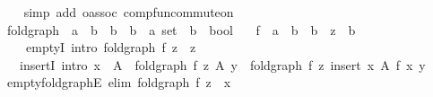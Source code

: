 \begin{isabellebody}
%
\isadelimproof
\ \ %
\endisadelimproof
%
\isatagproof
{}\isamarkupfalse%
\ {\isacharparenleft}{\kern0pt}simp\ add{\isacharcolon}{\kern0pt}\ o{\isacharunderscore}{\kern0pt}assoc\ comp{\isacharunderscore}{\kern0pt}fun{\isacharunderscore}{\kern0pt}commute{\isacharunderscore}{\kern0pt}on{\isacharparenright}{\kern0pt}%
\endisatagproof
{\isafoldproof}%
%
\isadelimproof
\isanewline
%
\endisadelimproof
\isanewline
{}\isamarkupfalse%
\isanewline
\isanewline
{}\isamarkupfalse%
\ fold{\isacharunderscore}{\kern0pt}graph\ {\isacharcolon}{\kern0pt}{\isacharcolon}{\kern0pt}\ {\isachardoublequoteopen}{\isacharparenleft}{\kern0pt}{\isacharprime}{\kern0pt}a\ {\isasymRightarrow}\ {\isacharprime}{\kern0pt}b\ {\isasymRightarrow}\ {\isacharprime}{\kern0pt}b{\isacharparenright}{\kern0pt}\ {\isasymRightarrow}\ {\isacharprime}{\kern0pt}b\ {\isasymRightarrow}\ {\isacharprime}{\kern0pt}a\ set\ {\isasymRightarrow}\ {\isacharprime}{\kern0pt}b\ {\isasymRightarrow}\ bool{\isachardoublequoteclose}\isanewline
\ \ \ f\ {\isacharcolon}{\kern0pt}{\isacharcolon}{\kern0pt}\ {\isachardoublequoteopen}{\isacharprime}{\kern0pt}a\ {\isasymRightarrow}\ {\isacharprime}{\kern0pt}b\ {\isasymRightarrow}\ {\isacharprime}{\kern0pt}b{\isachardoublequoteclose}\ \ z\ {\isacharcolon}{\kern0pt}{\isacharcolon}{\kern0pt}\ {\isacharprime}{\kern0pt}b\isanewline
\ \ \isanewline
\ \ \ \ emptyI\ {\isacharbrackleft}{\kern0pt}intro{\isacharbrackright}{\kern0pt}{\isacharcolon}{\kern0pt}\ {\isachardoublequoteopen}fold{\isacharunderscore}{\kern0pt}graph\ f\ z\ {\isacharbraceleft}{\kern0pt}{\isacharbraceright}{\kern0pt}\ z{\isachardoublequoteclose}\isanewline
\ \ {\isacharbar}{\kern0pt}\ insertI\ {\isacharbrackleft}{\kern0pt}intro{\isacharbrackright}{\kern0pt}{\isacharcolon}{\kern0pt}\ {\isachardoublequoteopen}x\ {\isasymnotin}\ A\ {\isasymLongrightarrow}\ fold{\isacharunderscore}{\kern0pt}graph\ f\ z\ A\ y\ {\isasymLongrightarrow}\ fold{\isacharunderscore}{\kern0pt}graph\ f\ z\ {\isacharparenleft}{\kern0pt}insert\ x\ A{\isacharparenright}{\kern0pt}\ {\isacharparenleft}{\kern0pt}f\ x\ y{\isacharparenright}{\kern0pt}{\isachardoublequoteclose}\isanewline
\isanewline
{}\isamarkupfalse%
\ empty{\isacharunderscore}{\kern0pt}fold{\isacharunderscore}{\kern0pt}graphE\ {\isacharbrackleft}{\kern0pt}elim{\isacharbang}{\kern0pt}{\isacharbrackright}{\kern0pt}{\isacharcolon}{\kern0pt}\ {\isachardoublequoteopen}fold{\isacharunderscore}{\kern0pt}graph\ f\ z\ {\isacharbraceleft}{\kern0pt}{\isacharbraceright}{\kern0pt}\ x{\isachardoublequoteclose}\isanewline

\end{isabellebody}
